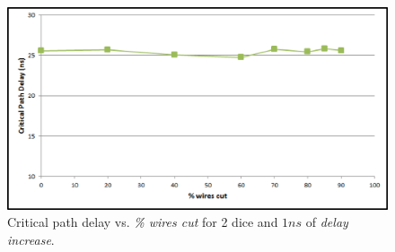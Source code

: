 \documentclass{sig-alternate-2013}
\begin{document}
\begin{figure}[!htbp]
\centering
\includegraphics[width=\linewidth]{standard_crit_path_new.eps}
\caption{Critical path delay vs. \textit{\% wires cut} for 2 dice and $1ns$ of \textit{delay increase}.}
\label{fig:standard_crit}
\end{figure}



\end{document}

